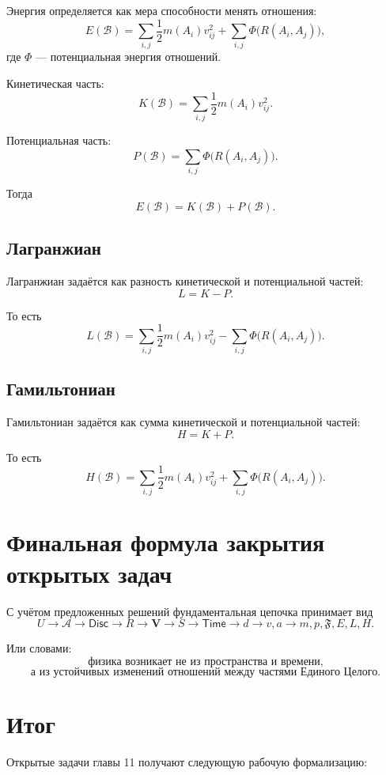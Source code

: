\documentclass[12pt,a4paper]{article}
\newcommand{\Whole}{U}
\newcommand{\Parts}{\mathcal A}
\newcommand{\SubParts}{\mathcal B}
\newcommand{\Rel}{R}
\newcommand{\Vstruct}{\mathbf V}
\newcommand{\State}{S}
\newcommand{\Disc}{\mathsf{Disc}}
\newcommand{\Time}{\mathsf{Time}}
\newcommand{\Force}{\mathfrak F}
\begin{document}
Энергия определяется как мера способности менять отношения:
\[
E(\SubParts)=
\sum_{i,j}\frac12 m(A_i)v_{ij}^2
+
\sum_{i,j}\Phi\bigl(\Rel(A_i,A_j)\bigr),
\]
где \(\Phi\) --- потенциальная энергия отношений.

Кинетическая часть:
\[
K(\SubParts)=\sum_{i,j}\frac12 m(A_i)v_{ij}^2.
\]

Потенциальная часть:
\[
P(\SubParts)=\sum_{i,j}\Phi\bigl(\Rel(A_i,A_j)\bigr).
\]

Тогда
\[
E(\SubParts)=K(\SubParts)+P(\SubParts).
\]

\subsection{Лагранжиан}

Лагранжиан задаётся как разность кинетической и потенциальной частей:
\[
L=K-P.
\]

То есть
\[
L(\SubParts)=
\sum_{i,j}\frac12 m(A_i)v_{ij}^2
-
\sum_{i,j}\Phi\bigl(\Rel(A_i,A_j)\bigr).
\]

\subsection{Гамильтониан}

Гамильтониан задаётся как сумма кинетической и потенциальной частей:
\[
H=K+P.
\]

То есть
\[
H(\SubParts)=
\sum_{i,j}\frac12 m(A_i)v_{ij}^2
+
\sum_{i,j}\Phi\bigl(\Rel(A_i,A_j)\bigr).
\]

\section{Финальная формула закрытия открытых задач}

С учётом предложенных решений фундаментальная цепочка принимает вид
\[
\Whole
\to
\Parts
\to
\Disc
\to
\Rel
\to
\Vstruct
\to
\State
\to
\Time
\to
 d
\to
 v,a
\to
 m,p,\Force,E,L,H.
\]

Или словами:
\[
\boxed{\text{физика возникает не из пространства и времени,}}
\]
\[
\boxed{\text{а из устойчивых изменений отношений между частями Единого Целого.}}
\]

\section*{Итог}

Открытые задачи главы 11 получают следующую рабочую формализацию:
\end{document}
